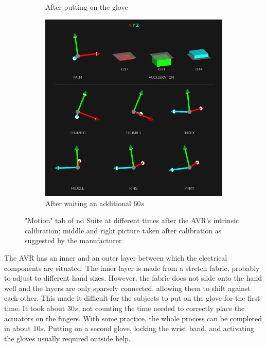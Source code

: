 \documentclass[hyperref, bachelorofscience]{cgvpub}
\begin{document}
\begin{figure}
\begin{subfigure}{.3\linewidth}
		\caption{After putting on the glove}
		\label{fig:glove_cal:puton}
	\end{subfigure}
	\hfill
	\begin{subfigure}{.3\linewidth}
		\includegraphics[width=\linewidth]{../pics/glove_cal3}
		\caption{After waiting an additional $ 60s $}
		\label{fig:glove_cal:minute}
	\end{subfigure}
	\caption{"Motion" tab of \acrshort{nd} Suite at different times after the \Gls{AVR}'s intrinsic calibration; middle and right picture taken after calibration as suggested by the manufacturer}
	\label{fig:glove_cal}
\end{figure}

The \Gls{AVR} has an inner and an outer layer between which the electrical components are situated. The inner layer is made from a stretch fabric, probably to adjust to different hand sizes. However, the fabric does not slide onto the hand well and the layers are only sparsely connected, allowing them to shift against each other. This made it difficult for the subjects to put on the glove for the first time. It took about $ 30s $, not counting the time needed to correctly place the actuators on the fingers. With some practice, the whole process can be completed in about $ 10s $. Putting on a second glove, locking the wrist band, and activating the gloves usually required outside help. 
\end{document}
